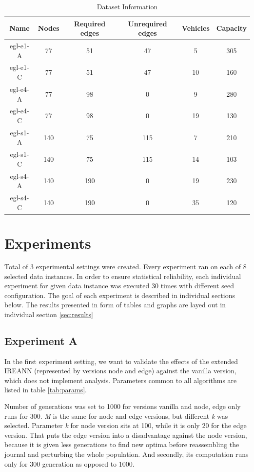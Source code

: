 \documentclass[twoside]{ctuthesis}
\theoremstyle{plain}
\theoremstyle{definition}
\theoremstyle{note}
\begin{document}
\begin{table}[htbp]
	\centering
	\caption{Dataset Information}
	\label{tab:dataset}
	\begin{tabular}{cccccc}
		\textbf{Name} & \textbf{Nodes} & \textbf{Required edges} & \textbf{Unrequired edges} & \textbf{Vehicles} & \textbf{Capacity} \\
		\hline
		egl-e1-A & 77 & 51 & 47 & 5 & 305 \\
		egl-e1-C & 77 & 51 & 47 & 10 & 160 \\
		egl-e4-A & 77 & 98 & 0 & 9 & 280 \\
		egl-e4-C & 77 & 98 & 0 & 19 & 130 \\
		egl-s1-A & 140 & 75 & 115 & 7 & 210 \\
		egl-s1-C & 140 & 75 & 115 & 14 & 103 \\
		egl-s4-A & 140 & 190 & 0 & 19 & 230 \\
		egl-s4-C & 140 & 190 & 0 & 35 & 120 \\
		\hline
	\end{tabular}
\end{table}


\section{Experiments}
\label{sec:expdesc}
Total of 3 experimental settings were created. Every experiment ran on each of 8 selected data instances.
In order to ensure statistical reliability, each individual experiment for given data instance was executed 30 times with different seed configuration.
The goal of each experiment is described in individual sections below.
The results presented in form of tables and graphs are layed out in individual section \ref{sec:results}

\subsection{Experiment A}
\label{sec:expadesc}
In the first experiment setting, we want to validate the effects of the extended IREANN (represented by versions node and edge) against the vanilla version, which does not implement analysis. Parameters common to all algorithms are listed in table \ref{tab:params}.

Number of generations was set to 1000 for versions vanilla and node, edge only runs for 300. \emph{M} is the same for node and edge versions, but different \emph{k} was selected. Parameter \emph{k} for node version sits at 100, while it is only 20 for the edge version. That puts the edge version into a disadvantage against the node version, because it is given less generations to find new optima before reassembling the journal and perturbing the whole population. And secondly, its computation runs only for 300 generation as opposed to 1000.
\end{document}
